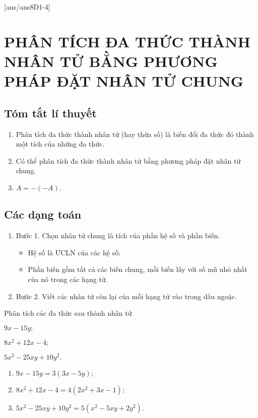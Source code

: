 [ans/ans8D1-4]
\section{PHÂN TÍCH ĐA THỨC THÀNH NHÂN TỬ BẰNG PHƯƠNG PHÁP ĐẶT NHÂN TỬ CHUNG}
\subsection{Tóm tắt lí thuyết}
\begin{enumerate}[\tickEX]
	\item Phân tích đa thức thành nhân tử (hay thừa số) là biến đổi đa thức đó thành một tích của những đa thức.
	\item Có thể phân tích đa thức thành nhân tử bằng phương pháp đặt nhân tử chung.
	\item $A=-(-A).$
\end{enumerate}

\subsection{Các dạng toán}
\begin{dang}
\begin{enumerate}[\tickEX]
	\item Bước 1. Chọn nhân tử chung là tích của phần hệ số và phần biến.
	\begin{itemize}
		\item Hệ số là ƯCLN của các hệ số;
		\item Phần biến gồm tất cả các biến chung, mỗi biến lấy với số mũ nhỏ nhất của nó trong các hạng tử.
	\end{itemize}
	\item Bước 2. Viết các nhân tử còn lại của mỗi hạng tử vào trong dấu ngoặc.
\end{enumerate}
\end{dang}

\begin{vd}
Phân tích các đa thức sau thành nhân tử	
\begin{listEX}[3] 
	\item $9x-15y;$
	\item $8x^2+12x-4;$
	\item $5x^2-25xy+10y^2.$
\end{listEX}
	\loigiai
	{
		\begin{enumerate}	
			\item  $9x-15y=3(3x-5y);$
			\item $8x^2+12x-4= 4 \left( 2x^2 +3x-1 \right) ;$
				\item $5x^2-25xy+10y^2= 5\left( x^2 -5xy+2y^2\right) .$
		\end{enumerate}
	}
\end{vd}

